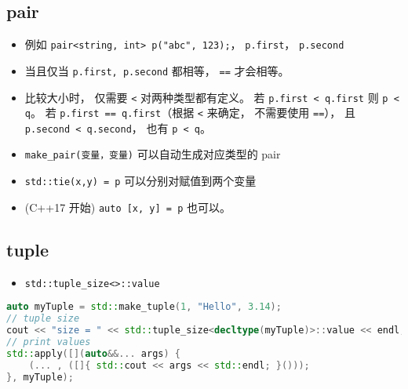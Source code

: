 
\begin{issues}
\issueDraft
\end{issues}

\subsection{pair}
\begin{itemize}
\item 例如 \verb|pair<string, int> p("abc", 123);|， \verb|p.first|， \verb|p.second|
\item 当且仅当 \verb|p.first, p.second| 都相等， \verb|==| 才会相等。
\item 比较大小时， 仅需要 \verb|<| 对两种类型都有定义。 若 \verb|p.first < q.first| 则 \verb|p < q|。 若 \verb|p.first == q.first|（根据 \verb|<| 来确定， 不需要使用 \verb|==|）， 且 \verb|p.second < q.second|， 也有 \verb|p < q|。
\item \verb|make_pair(变量，变量)| 可以自动生成对应类型的 pair
\item \verb|std::tie(x,y) = p| 可以分别对赋值到两个变量
\item (C++17 开始) \verb|auto [x, y] = p| 也可以。
\end{itemize}

\subsection{tuple}
\begin{itemize}
\item \verb`std::tuple_size<>::value`
\end{itemize}

\begin{lstlisting}[language=cpp]
auto myTuple = std::make_tuple(1, "Hello", 3.14);
// tuple size
cout << "size = " << std::tuple_size<decltype(myTuple)>::value << endl;
// print values
std::apply([](auto&&... args) {
    (... , ([]{ std::cout << args << std::endl; }()));
}, myTuple);
\end{lstlisting}

